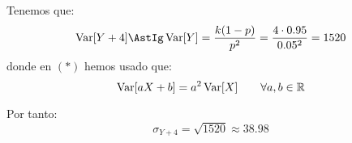 \begin{ejercicio}
\begin{enumerate}
        Tenemos que:
        \begin{equation*}
            \Var[Y+4] \AstIg \Var[Y]= \dfrac{k(1-p)}{p^2} = \dfrac{4\cdot 0.95}{0.05^2} = 1520
        \end{equation*}
        donde en $(\ast)$ hemos usado que:
        \begin{equation*}
            \operatorname{Var}[aX+b] = a^2\operatorname{Var}[X] \qquad \forall a,b\in \mathbb{R}
        \end{equation*}

        Por tanto:
        \begin{equation*}
            \sigma_{Y+4} = \sqrt{1520} \approx 38.98
        \end{equation*}
    \end{enumerate}
\end{ejercicio}


